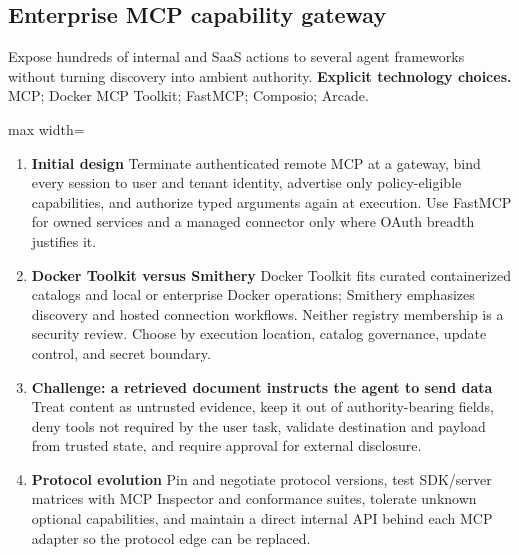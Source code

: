 \subsection{Enterprise MCP capability gateway}
Expose hundreds of internal and SaaS actions to several agent frameworks without turning discovery into ambient authority.
\textbf{Explicit technology choices.} MCP; Docker MCP Toolkit; FastMCP; Composio; Arcade.
\begin{center}\begin{adjustbox}{max width=\linewidth}\end{adjustbox}\end{center}
\begin{enumerate}
\item \textbf{Initial design} Terminate authenticated remote MCP at a gateway, bind every session to user and tenant identity, advertise only policy-eligible capabilities, and authorize typed arguments again at execution. Use FastMCP for owned services and a managed connector only where OAuth breadth justifies it.
\item \textbf{Docker Toolkit versus Smithery} Docker Toolkit fits curated containerized catalogs and local or enterprise Docker operations; Smithery emphasizes discovery and hosted connection workflows. Neither registry membership is a security review. Choose by execution location, catalog governance, update control, and secret boundary.
\item \textbf{Challenge: a retrieved document instructs the agent to send data} Treat content as untrusted evidence, keep it out of authority-bearing fields, deny tools not required by the user task, validate destination and payload from trusted state, and require approval for external disclosure.
\item \textbf{Protocol evolution} Pin and negotiate protocol versions, test SDK/server matrices with MCP Inspector and conformance suites, tolerate unknown optional capabilities, and maintain a direct internal API behind each MCP adapter so the protocol edge can be replaced.
\end{enumerate}
